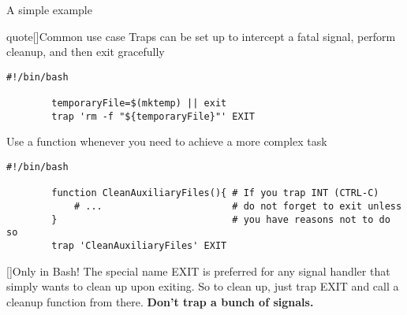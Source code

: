 \begin{frame}[fragile]{A simple example}
    \vspace{-4mm}
    \begin{varblock}{quote}[\textwidth]{Common use case}
        \normalsize\textnormal{Traps can be set up to intercept a fatal signal, perform cleanup, and then exit gracefully}
    \end{varblock}
    \begin{lstlisting}[style=MyBash, emph={[7]temporaryFile}, belowskip=-5mm]
        #!/bin/bash
        
        temporaryFile=$(mktemp) || exit
        trap 'rm -f "${temporaryFile}"' EXIT
    \end{lstlisting}
    Use a function whenever you need to achieve a more complex task
    \begin{lstlisting}[style=MyBash, emph={[7]temporaryFile}, aboveskip=2mm, belowskip=-5mm, xleftmargin=2mm, xrightmargin=3mm]
        #!/bin/bash
        
        function CleanAuxiliaryFiles(){ # If you trap INT (CTRL-C)
            # ...                       # do not forget to exit unless
        }                               # you have reasons not to do so
        trap 'CleanAuxiliaryFiles' EXIT
    \end{lstlisting}
    \small
    \begin{varblock}{}[\textwidth]{Only in Bash!}
        The special name EXIT is preferred for any signal handler that simply wants to clean up upon exiting.
        So to clean up, just trap EXIT and call a cleanup function from there. \textbf{Don't trap a bunch of signals.}
    \end{varblock}
\end{frame}
